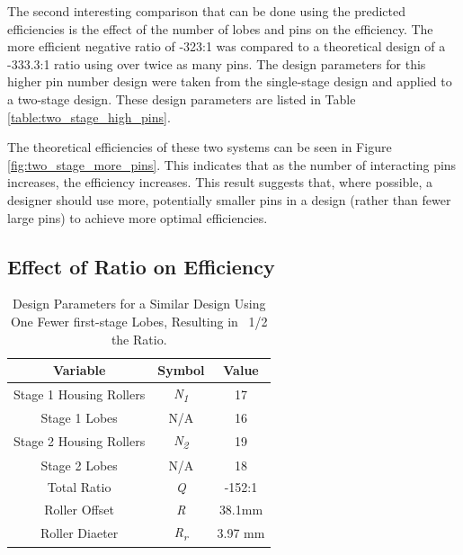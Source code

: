The second interesting comparison that can be done using the predicted efficiencies is the effect of the number of lobes and pins on the efficiency. The more efficient negative ratio of -323:1 was compared to a theoretical design of a -333.3:1 ratio using over twice as many pins. The design parameters for this higher pin number design were taken from the single-stage design and applied to a two-stage design. These design parameters are listed in Table \ref{table:two_stage_high_pins}. 

The theoretical efficiencies of these two systems can be seen in Figure \ref{fig:two_stage_more_pins}. This indicates that as the number of interacting pins increases, the efficiency increases. This result suggests that, where possible, a designer should use more, potentially smaller pins in a design (rather than fewer large pins) to achieve more optimal efficiencies. 



\subsection{Effect of Ratio on Efficiency} \label{ch:dual:discussion:ratio}

\begin{table}[!b]
  \vskip0.2cm
  \caption{Design Parameters for a Similar Design Using One Fewer first-stage Lobes, Resulting in ~1/2 the Ratio.}
  \label{table:two_stage_lower_ratio}
  \begin{center}
    \vskip-0.2cm
	\begin{tabular}{|c|c|c|}
		\hline
		Variable & Symbol & Value\\
		\hline
		Stage 1 Housing Rollers & \textit{N\textsubscript{1}} & 17\\
		\hline
		Stage 1 Lobes & N/A & 16\\
		\hline
		Stage 2 Housing Rollers & \textit{N\textsubscript{2}} & 19\\
		\hline
		Stage 2 Lobes & N/A & 18\\
		\hline
		Total Ratio & \textit{Q} & -152:1 \\
		\hline
		Roller Offset & \textit{R} & 38.1mm \\
		\hline
		Roller Diaeter & \textit{R\textsubscript{r}} & 3.97 mm\\
		\hline
	\end{tabular}
  \end{center}
\end{table}

